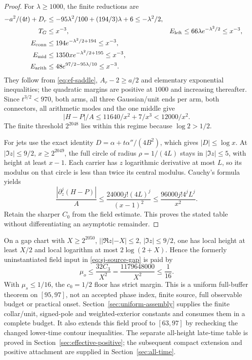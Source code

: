 \begin{proof}
For $\lambda\ge1000$, the finite reductions are
\begin{align}
 -a^2/(4t)+D_r&\le-95\lambda^2/100+(194/3)\lambda+6
                                           \le-\lambda^2/2,\notag\\
 T_G&\le x^{-3},& E_{\rm left}&\le66\lambda e^{-\lambda^2/2}\le x^{-3},\notag\\
 E_{\rm conn}&\le194e^{-\lambda^2/2+194}\le x^{-3},\notag\\
 E_{\rm mid}&\le1350x e^{-\lambda^2/2+195}\le x^{-3},\notag\\
 E_{\rm arith}&\le48e^{97/2-95\lambda/10}\le x^{-3}.
 \label{eq:ef-finite-decay}
\end{align}
They follow from \eqref{eq:ef-saddle}, $A_r-2\ge a/2$ and elementary
exponential inequalities; the quadratic margins are positive at $1000$
and increasing thereafter. Since $t^{3/2}<970$, both arms, all three
Gaussian/unit ends per arm, both connectors, all arithmetic modes and
the one middle give
\[
 |H-P|/A\le11640/x^2+7/x^3<12000/x^2.
\]
The finite threshold $2^{2048}$ lies within this regime because
$\log2>1/2$.

For jets use the exact identity
$D=\alpha+t\alpha''/(4B^2)$, which gives $|D|\le\log x$.
At $|\Im z|\le9/2$, $x\ge2^{2049}$, the full circle of radius
$\rho=1/(4L)$ stays in $|\Im z|\le5$, with height at least $x-1$.
Each carrier has $z$ logarithmic derivative at most $L$, so its modulus
on that circle is less than twice its central modulus. Cauchy's formula
\cite{DLMFCauchy1931} yields
\[
 \frac{|\partial_z^j(H-P)|}{A}
   \le\frac{24000j!(4L)^j}{(x-1)^2}
   \le\frac{96000j!4^jL^j}{x^2}.
\]
Retain the sharper $C_0$ from the field estimate. This proves the stated
table without differentiating an asymptotic remainder.
\end{proof}

On a gap chart with $X\ge2^{2050}$,
$||\Re z|-X|\le2$, $|\Im z|\le9/2$, one has local height at least
$X/2$ and local logarithm at most $2\log(2+X)$. Hence the formerly
uninstantiated field input in \eqref{eq:sj-source-gap} is paid by
\begin{equation}
 \mu_o\le\frac{32C_3}{X^2}
             =\frac{1179648000}{X^2}\le\frac1{16}.
 \label{eq:ef-gap-consumer}
\end{equation}
With $\mu_s\le1/16$, the $c_0=1/2$ floor has strict margin.
This is a uniform full-buffer theorem on $[95,97]$, not an accepted
phase index, finite source, full observable budget or practical onset.
Section~\ref{sec:uniform-assembly} supplies the finite collar/unit,
signed-pole and weighted-exterior constants and consumes them in a
complete budget. It also extends this field proof to $[63,97]$ by
rechecking the changed lower-time contour inequalities. The separate all-height late-time table is proved in
Section~\ref{sec:effective-positive}; the subsequent compact extension
and positive attachment are supplied in Section~\ref{sec:all-time}.
